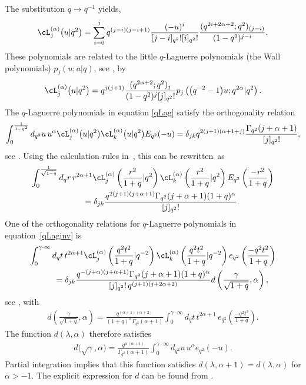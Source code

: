 The substitution $q\to q^{-1}$ yields,
\begin{gather}
\label{qLag}
\cL^{(\alpha)}_j\big(u|q^2\big) = \sum_{i=0}^jq^{(j-i)(j-i+1)}\frac{(-u)^i}{[j-i]_{q^2}![i]_{q^2}!}\frac{(q^{2i+2\alpha+2};q^2)_{(j-i)}}{(1-q^2)^{j-i}}.
\end{gather}
These polynomials are related to the little $q$-Laguerre polynomials (the Wall polynomials) $p_j(u;a|q)$, see \cite[Section~3.20]{Koekoek}, by
\begin{gather*}
\cL^{(\alpha)}_j\big(u|q^2\big) = q^{j(j+1)}\frac{(q^{2\alpha+2};q^2)_j}{(1-q^2)^j[j]_{q^2}!}p_j\left(\big(q^{-2}-1\big)u;q^{2\alpha}|q^2\right).
\end{gather*}
The $q$-Laguerre polynomials in equation \eqref{qLag} satisfy the orthogonality relation
\begin{gather*}
\int_0^{\frac{1}{1-q^2}}d_{q^2}u\,u^\alpha\cL_j^{(\alpha)}\big(u|q^2\big)\cL_k^{(\alpha)}\big(u|q^2\big)E_{q^2}(-u)=
\delta_{jk}q^{2(j+1)(\alpha+1+j)}\frac{\Gamma_{q^2}(j+\alpha+1)}{[j]_{q^2}!},
\end{gather*}
see \cite[equation (3.20.2)]{Koekoek}. Using the calculation rules in~\cite[Lemma 10]{MR2595267}, this can be rewritten~as
\begin{gather}
 \int_0^{\frac{1}{\sqrt{1-q}}}d_qr\, r^{2\alpha+1}\cL_j^{(\alpha)}\left(\frac{r^2}{1+q}|q^2\right)\cL_k^{(\alpha)}\left(\frac{r^2}{1+q}|q^2\right) E_{q^2}\left(\frac{-r^2}{1+q}\right)\nonumber\\
\qquad{} =\delta_{jk}\frac{q^{2(j+1)(j+\alpha+1)}\Gamma_{q^2}(j+\alpha+1)(1+q)^{\alpha}}{[j]_{q^2}!}.\label{orthLag1}
\end{gather}
One of the orthogonality relations for $q$-Laguerre polynomials in equation~\eqref{qLaginv} is
\begin{gather}
 \int_0^{\gamma\cdot\infty}d_qt\, t^{2\alpha+1}\cL_j^{(\alpha)}\left(\frac{q^2t^2}{1+q}|q^{-2}\right)\cL_k^{(\alpha)}\left(\frac{q^2t^2}{1+q}|q^{-2}\right)
 e_{q^2}\left(\frac{-q^2t^2}{1+q}\right)\nonumber\\
\qquad{} =\delta_{jk}\frac{q^{-(j+\alpha)(j+\alpha+1)}\Gamma_{q^2}(j+\alpha+1)
(1+q)^{\alpha}}{[j]_{q^2}!\,q^{(j+1)(j+2\alpha+2)}}d\left(\frac{\gamma}{\sqrt{1+q}},\alpha\right),\label{orthLag2}
\end{gather}
see \cite[equation~(3.21.3)]{Koekoek}, with
\begin{gather*}
d\left(\frac{\gamma}{\sqrt{1+q}},\alpha\right) = \frac{q^{(\alpha+1)(\alpha+2)}}{(1+q)^\alpha\Gamma_{q^2}(\alpha+1)}\int_0^{\gamma\cdot\infty}d_qt\, t^{2\alpha+1}\,e_{q^2}\left(\frac{-q^2t^2}{1+q}\right).
\end{gather*}
The function $d(\lambda,\alpha)$ therefore satisf\/ies
\begin{gather*}
d\big(\sqrt{\gamma},\alpha\big) = \frac{q^{\alpha(\alpha+1)}}{\Gamma_{q^2}(\alpha+1)}\int_0^{\gamma\cdot\infty}d_{q^2}u\,u^\alpha e_{q^2}(-u).
\end{gather*}
Partial integration implies that this function satisf\/ies $d(\lambda,\alpha+1)=d(\lambda,\alpha)$ for $\alpha>-1$. The explicit expression for $d$ can be found from \cite[equation~(3.21.3)]{Koekoek}.

